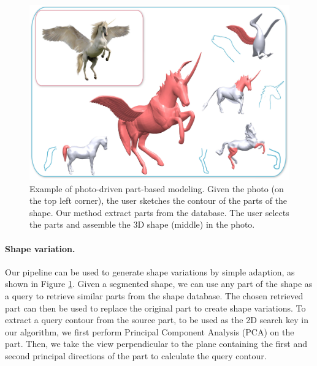 \begin{figure}\centering
\includegraphics[width=\linewidth]{./Material/PhotoDrivenModeling.pdf}
\caption{Example of photo-driven part-based modeling. Given the photo (on the top left corner), the user sketches the contour of the parts of the shape. Our method extract parts from the database. The user selects the parts and assemble the 3D shape (middle) in the photo.}\label{fig:SegedAsInput}
\end{figure}

\paragraph*{Shape variation.} Our pipeline can be used to generate shape variations by simple adaption, as shown in Figure \ref{fig:SegedAsInput}. Given a segmented shape, we can use any part of the shape as a query to retrieve similar parts from the shape database. The chosen retrieved part can then be used to replace the original part to create shape variations. To extract a query contour from the source part, to be used as the 2D search key in our algorithm, we first perform Principal Component Analysis (PCA) on the part. Then, we take the view perpendicular to the plane containing the first and second principal directions of the part to calculate the query contour.

